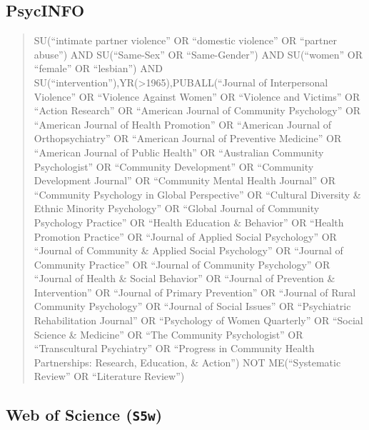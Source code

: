 \documentclass[]{tufte-handout}
\begin{document}
\subsection{PsycINFO}\label{psycinfo-4}

\begin{quote}
SU(``intimate partner violence'' OR ``domestic violence'' OR ``partner
abuse'') AND SU(``Same-Sex'' OR ``Same-Gender'') AND SU(``women'' OR
``female'' OR ``lesbian'') AND
SU(``intervention''),YR(\textgreater{}1965),PUBALL(``Journal of
Interpersonal Violence'' OR ``Violence Against Women'' OR ``Violence and
Victims'' OR ``Action Research'' OR ``American Journal of Community
Psychology'' OR ``American Journal of Health Promotion'' OR ``American
Journal of Orthopsychiatry'' OR ``American Journal of Preventive
Medicine'' OR ``American Journal of Public Health'' OR ``Australian
Community Psychologist'' OR ``Community Development'' OR ``Community
Development Journal'' OR ``Community Mental Health Journal'' OR
``Community Psychology in Global Perspective'' OR ``Cultural Diversity
\& Ethnic Minority Psychology'' OR ``Global Journal of Community
Psychology Practice'' OR ``Health Education \& Behavior'' OR ``Health
Promotion Practice'' OR ``Journal of Applied Social Psychology'' OR
``Journal of Community \& Applied Social Psychology'' OR ``Journal of
Community Practice'' OR ``Journal of Community Psychology'' OR ``Journal
of Health \& Social Behavior'' OR ``Journal of Prevention \&
Intervention'' OR ``Journal of Primary Prevention'' OR ``Journal of
Rural Community Psychology'' OR ``Journal of Social Issues'' OR
``Psychiatric Rehabilitation Journal'' OR ``Psychology of Women
Quarterly'' OR ``Social Science \& Medicine'' OR ``The Community
Psychologist'' OR ``Transcultural Psychiatry'' OR ``Progress in
Community Health Partnerships: Research, Education, \& Action'') NOT
ME(``Systematic Review'' OR ``Literature Review'')
\end{quote}

\subsection{\texorpdfstring{Web of Science
(\texttt{S5w})}{Web of Science (S5w)}}\label{web-of-science-s5w}
\end{document}
